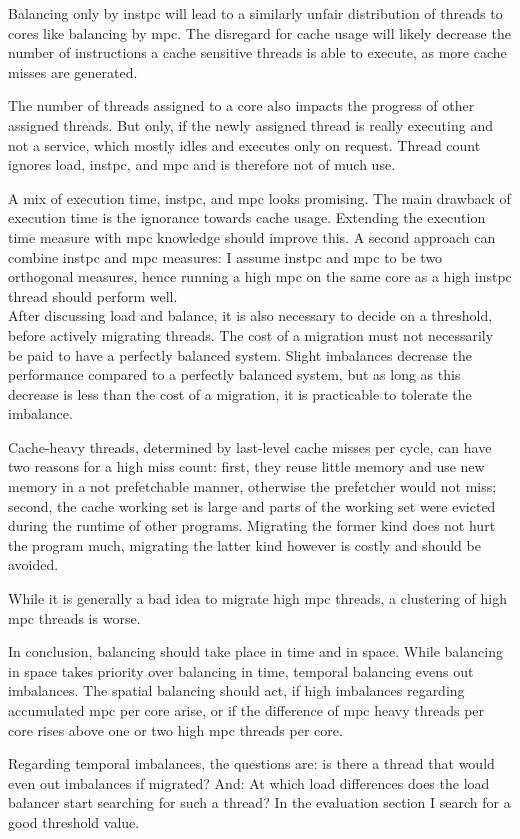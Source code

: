 Balancing only by \gls{instpc} will lead to a similarly unfair distribution of
threads to cores like balancing by \gls{mpc}.
The disregard for cache usage will likely decrease the number of instructions
a cache sensitive threads is able to execute, as more cache misses are
generated.

The number of threads assigned to a core also impacts the progress of other
assigned threads.
But only, if the newly assigned thread is really executing and not a service,
which mostly idles and executes only on request.
Thread count ignores load, \gls{instpc}, and \gls{mpc} and is therefore
not of much use.

A mix of execution time, \gls{instpc}, and \gls{mpc} looks promising.
The main drawback of execution time is the ignorance towards cache usage.
Extending the execution time measure with \gls{mpc} knowledge should improve this.
A second approach can combine \gls{instpc} and \gls{mpc} measures: I assume
\gls{instpc} and \gls{mpc} to be two orthogonal measures, hence running a
high \gls{mpc} on the same core as a high \gls{instpc} thread should perform
well.
\\


After discussing load and balance, it is also necessary to decide on a
threshold, before actively migrating threads.
The cost of a migration must not necessarily be paid to have a perfectly
balanced system.
Slight imbalances decrease the performance compared to a perfectly balanced
system, but as long as this decrease is less than the cost of a migration,
it is practicable to tolerate the imbalance.

Cache-heavy threads, determined by last-level cache misses per cycle, can have
two reasons for a high miss count: first, they reuse little memory and use new
memory in a not prefetchable manner, otherwise the prefetcher would not miss;
second, the cache working set is large and parts of the working set were
evicted during the runtime of other programs.
Migrating the former kind does not hurt the program much, migrating the latter
kind however is costly and should be avoided.

While it is generally a bad idea to migrate high \gls{mpc} threads, a
clustering of high \gls{mpc} threads is worse.

In conclusion, balancing should take place in time and in space.
While balancing in space takes priority over balancing in time, temporal
balancing evens out imbalances.
The spatial balancing should act, if high imbalances regarding accumulated
\gls{mpc} per core arise, or if the difference of \gls{mpc} heavy threads per
core rises above one or two high \gls{mpc} threads per core.

Regarding temporal imbalances, the questions are: is there a thread that would
even out imbalances if migrated?
And: At which load differences does the load balancer start searching for such
a thread?
In the evaluation section I search for a good threshold value.
